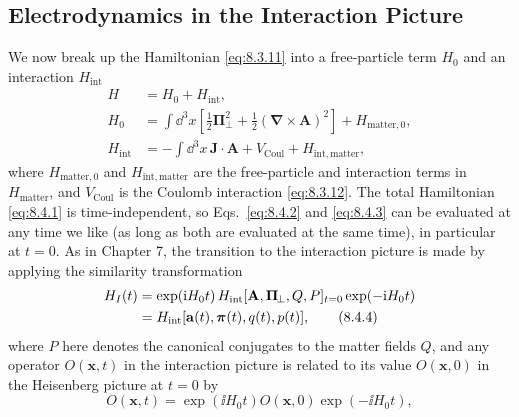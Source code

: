 
\subsection{Electrodynamics in the Interaction Picture}

We now break up the Hamiltonian \eqref{eq:8.3.11} into a free-particle term $H_0$
and an interaction $H_{\mathrm{int}}$
\begin{align}
H&=H_0+H_{\mathrm{int}},
\tag{8.4.1}\label{eq:8.4.1}\\
H_0&=\int \dd^3x\left[
  \frac12\boldsymbol\Pi_{\!\perp}^{2}
  +\frac12(\boldsymbol\nabla\times\mathbf A)^2
  \right]+H_{\mathrm{matter},0},
\tag{8.4.2}\label{eq:8.4.2}\\
H_{\mathrm{int}}&=-\int \dd^3x\,\mathbf J\cdot\mathbf A
  +V_{\mathrm{Coul}}+H_{\mathrm{int,matter}},
\tag{8.4.3}\label{eq:8.4.3}
\end{align}
where $H_{\mathrm{matter},0}$ and $H_{\mathrm{int,matter}}$ are the
free-particle and interaction terms in $H_{\mathrm{matter}}$, and
$V_{\mathrm{Coul}}$ is the Coulomb interaction \eqref{eq:8.3.12}. The total Hamiltonian
\eqref{eq:8.4.1} is time-independent, so Eqs.~\eqref{eq:8.4.2} and \eqref{eq:8.4.3} can be evaluated at
any time we like (as long as both are evaluated at the same time), in
particular at $t=0$. As in Chapter 7, the transition to the interaction
picture is made by applying the similarity transformation
\begin{align}
H_I(t)
&=\exp(\mathrm{i} H_0t)\,
  H_{\mathrm{int}}[\mathbf A,\boldsymbol\Pi_{\!\perp},Q,P]_{t=0}
  \exp(-\mathrm{i} H_0t)
\notag\\
&=H_{\mathrm{int}}[\mathbf a(t),\boldsymbol\pi(t),q(t),p(t)],
\tag{8.4.4}\label{eq:8.4.4}
\end{align}
where $P$ here denotes the canonical conjugates to the matter fields $Q$, and
any operator $O(\mathbf x,t)$ in the interaction picture is related to its
value $O(\mathbf x,0)$ in the Heisenberg picture at $t=0$ by
\begin{equation}
O(\mathbf x,t)=\exp(\ii H_0t)O(\mathbf x,0)\exp(-\ii H_0t),
\tag{8.4.5}\label{eq:8.4.5}
\end{equation}
